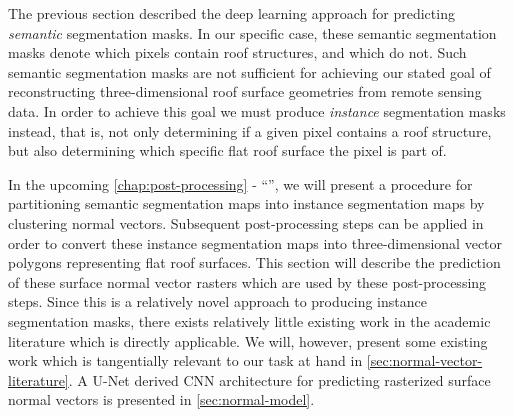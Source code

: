 The previous section described the deep learning approach for predicting \emph{semantic} segmentation masks.
In our specific case, these semantic segmentation masks denote which pixels contain roof structures, and which do not.
Such semantic segmentation masks are not sufficient for achieving our stated goal of reconstructing three-dimensional roof surface geometries from remote sensing data.
In order to achieve this goal we must produce \emph{instance} segmentation masks instead, that is, not only determining if a given pixel contains a roof structure, but also determining which specific flat roof surface the pixel is part of.

In the upcoming \cref{chap:post-processing} - \enquote{}, we will present a procedure for partitioning semantic segmentation maps into instance segmentation maps by clustering normal vectors.
Subsequent post-processing steps can be applied in order to convert these instance segmentation maps into three-dimensional vector polygons representing flat roof surfaces.
This section will describe the prediction of these surface normal vector rasters which are used by these post-processing steps.
Since this is a relatively novel approach to producing instance segmentation masks, there exists relatively little existing work in the academic literature which is directly applicable.
We will, however, present some existing work which is tangentially relevant to our task at hand in \cref{sec:normal-vector-literature}.
A U-Net derived CNN architecture for predicting rasterized surface normal vectors is presented in \cref{sec:normal-model}.
